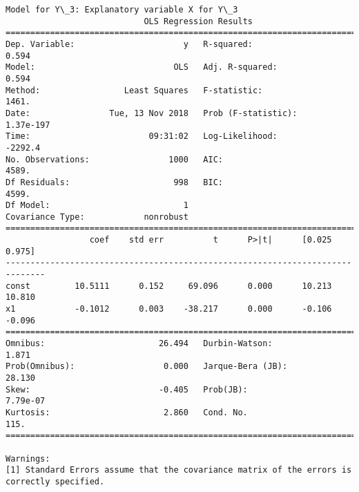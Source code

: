 \documentclass[11pt]{article}
\begin{document}
\begin{Verbatim}[commandchars=\\\{\}]
Model for Y\_3: Explanatory variable X for Y\_3
                            OLS Regression Results                            
==============================================================================
Dep. Variable:                      y   R-squared:                       0.594
Model:                            OLS   Adj. R-squared:                  0.594
Method:                 Least Squares   F-statistic:                     1461.
Date:                Tue, 13 Nov 2018   Prob (F-statistic):          1.37e-197
Time:                        09:31:02   Log-Likelihood:                -2292.4
No. Observations:                1000   AIC:                             4589.
Df Residuals:                     998   BIC:                             4599.
Df Model:                           1                                         
Covariance Type:            nonrobust                                         
==============================================================================
                 coef    std err          t      P>|t|      [0.025      0.975]
------------------------------------------------------------------------------
const         10.5111      0.152     69.096      0.000      10.213      10.810
x1            -0.1012      0.003    -38.217      0.000      -0.106      -0.096
==============================================================================
Omnibus:                       26.494   Durbin-Watson:                   1.871
Prob(Omnibus):                  0.000   Jarque-Bera (JB):               28.130
Skew:                          -0.405   Prob(JB):                     7.79e-07
Kurtosis:                       2.860   Cond. No.                         115.
==============================================================================

Warnings:
[1] Standard Errors assume that the covariance matrix of the errors is correctly specified.



\end{Verbatim}
\end{document}
